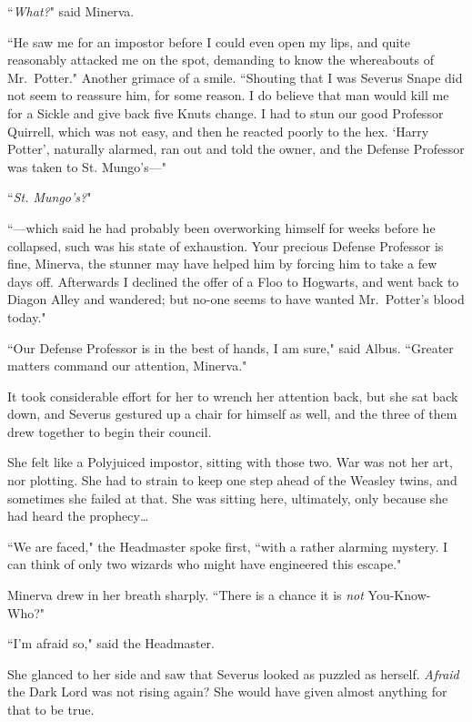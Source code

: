 ``\emph{What?}" said Minerva.

``He saw me for an impostor before I could even open my lips, and quite reasonably attacked me on the spot, demanding to know the whereabouts of Mr.~Potter." Another grimace of a smile. ``Shouting that I was Severus Snape did not seem to reassure him, for some reason. I do believe that man would kill me for a Sickle and give back five Knuts change. I had to stun our good Professor Quirrell, which was not easy, and then he reacted poorly to the hex. `Harry Potter', naturally alarmed, ran out and told the owner, and the Defense Professor was taken to St. Mungo's—"

``\emph{St. Mungo's?}"

``—which said he had probably been overworking himself for weeks before he collapsed, such was his state of exhaustion. Your precious Defense Professor is fine, Minerva, the stunner may have helped him by forcing him to take a few days off. Afterwards I declined the offer of a Floo to Hogwarts, and went back to Diagon Alley and wandered; but no-one seems to have wanted Mr.~Potter's blood today."

``Our Defense Professor is in the best of hands, I am sure," said Albus. ``Greater matters command our attention, Minerva."

It took considerable effort for her to wrench her attention back, but she sat back down, and Severus gestured up a chair for himself as well, and the three of them drew together to begin their council.

She felt like a Polyjuiced impostor, sitting with those two. War was not her art, nor plotting. She had to strain to keep one step ahead of the Weasley twins, and sometimes she failed at that. She was sitting here, ultimately, only because she had heard the prophecy{\ldots}

``We are faced," the Headmaster spoke first, ``with a rather alarming mystery. I can think of only two wizards who might have engineered this escape."

Minerva drew in her breath sharply. ``There is a chance it is \emph{not} You-Know-Who?"

``I'm afraid so," said the Headmaster.

She glanced to her side and saw that Severus looked as puzzled as herself. \emph{Afraid} the Dark Lord was not rising again? She would have given almost anything for that to be true.

